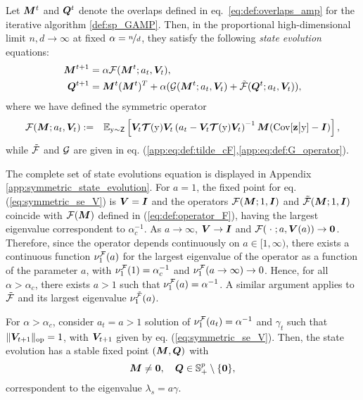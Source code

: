 \begin{proposition}\label{result:se_symm}
Let $\bm{M}^{t}$ and $\bm{Q}^{t}$ denote the overlaps defined in eq.~\eqref{eq:def:overlaps_amp} for the iterative algorithm \eqref{def:sp_GAMP}. Then, in the proportional high-dimensional limit $n,d\to\infty$ at fixed $\alpha = \nicefrac{n}{d}$, they satisfy the following \emph{state evolution} equations:
\begin{equation}
\begin{aligned}
    \bm{M}^{t+1} &= \alpha{\mathcal F}({\boldsymbol M}^t;a_t,{\boldsymbol V}_t),\\
    \bm{Q}^{t+1} &={\boldsymbol M}^t({\boldsymbol M}^t)^T + \alpha ({\mathcal G}({\boldsymbol M}^t;a_t,{\boldsymbol V}_t) + \Tilde{{\mathcal F}}({\boldsymbol Q}^t;a_t,{\boldsymbol V}_t)),
\end{aligned}
\end{equation}
where we have defined the symmetric operator
\begin{equation}
\begin{aligned}
    &{\mathcal F}({\boldsymbol M}; a_t, {\boldsymbol V}_t) := &\mathbb{E}_{{ \mathrm{y} }\sim\mathsf{Z}}\left[{\boldsymbol V}_t\boldsymbol{\mathcal{T}}({ \mathrm{y} }){\boldsymbol V}_t\left(a_t - {\boldsymbol V}_t\boldsymbol{\mathcal{T}}({ \mathrm{y} }){\boldsymbol V}_t\right)^{-1}\bm{M}(\mathrm{Cov}[\boldsymbol{\mathbf{z}}\big|{ \mathrm{y} }]-{\boldsymbol I})\right],
\end{aligned}
\end{equation}
while $\tilde{{\mathcal F}}$ and ${\mathcal G}$ are given in eq. (\ref{app:eq:def:tilde_cF},\ref{app:eq:def:G_operator}).
\end{proposition}
The complete set of state evolutions equation is displayed in Appendix \ref{app:symmetric_state_evolution}. For $a = 1$, the fixed point for eq. (\ref{eq:symmetric_se_V}) is ${\boldsymbol V} = {\boldsymbol I}$ and the operators ${\mathcal F}({\boldsymbol M}; 1, {\boldsymbol I})$ and $\tilde{{\mathcal F}}({\boldsymbol M};1,{\boldsymbol I})$ coincide with ${\mathcal F}({\boldsymbol M})$ defined in (\ref{eq:def:operator_F}), having the largest eigenvalue correspondent to $\alpha_c^{-1}$. As $a\to\infty$, ${\boldsymbol V}\to{\boldsymbol I}$ and ${\mathcal F}(\;\cdot\;;a,{\boldsymbol V}(a))\to{\boldsymbol 0}$. Therefore, since the operator depends continuously on $a\in[1,\infty)$, there exists a continuous function $\nu_1^{{\mathcal F}}(a)$ for the largest eigenvalue of the operator as a function of the parameter $a$, with $\nu_1^{{\mathcal F}}(1) = \alpha_c^{-1}$ and $\nu_1^{{\mathcal F}}(a\to\infty)\to0$. Hence, for all $\alpha > \alpha_c$, there exists $a>1$ such that $\nu_1^{{\mathcal F}}(a) = \alpha^{-1}$. A similar argument applies to $\tilde{{\mathcal F}}$ and its largest eigenvalue $\nu_1^{\tilde{{\mathcal F}}}(a)$.
\begin{lemma} \label{result:3}For $\alpha > \alpha_c$, consider $a_t=a>1$ solution of $\nu_1^{{\mathcal F}}(a_t) = \alpha^{-1}$ and $\gamma_t$ such that $ \|{\boldsymbol V}_{t+1} \|_{\mathrm{op}}  = 1$,
with ${\boldsymbol V}_{t+1}$ given by eq. (\ref{eq:symmetric_se_V}). Then, the state evolution has a stable fixed point $({\boldsymbol M},{\boldsymbol Q})$ with
\begin{equation}
    {\boldsymbol M} \neq {\boldsymbol 0},\quad{\boldsymbol Q}\in\mathbb{S}_+^p \setminus \{{\boldsymbol 0}\},
\end{equation}
correspondent to the eigenvalue $\lambda_s = a\gamma$.
\end{lemma}
